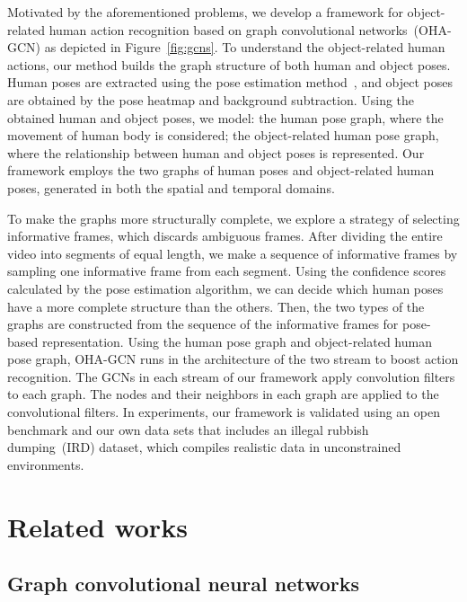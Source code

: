\documentclass[10pt,twocolumn,letterpaper]{article}
\begin{document}
Motivated by the aforementioned problems, we develop a framework 
for object-related human action recognition based on graph convolutional networks~(OHA-GCN) as depicted in Figure~\ref{fig:gcns}.
To understand the object-related human actions, our method builds the graph structure of both human and object poses.
Human poses are extracted using the pose estimation method~\cite{cao2017realtime}, and object poses are obtained by the pose heatmap and background subtraction.
Using the obtained human and object poses, we model:
 the human pose graph, where the movement of human body is considered; 
 the object-related human pose graph, where the relationship between human and object poses is represented.
Our framework employs the two graphs of human poses and object-related human poses, generated in both the spatial and temporal domains.

To make the graphs more structurally complete, we explore a strategy of selecting informative frames, which discards ambiguous frames.  
After dividing the entire video into segments of equal length, we make a sequence of informative frames by sampling one informative frame from each segment.
Using the confidence scores calculated by the pose estimation algorithm, we can decide which human poses have a more complete structure than the others.
Then, the two types of the graphs are constructed from the sequence of the informative frames for pose-based representation.
Using the human pose graph and object-related human pose graph, OHA-GCN runs in the architecture of the two stream to boost action recognition.
The GCNs in each stream of our framework apply convolution filters to each graph.
The nodes and their neighbors in each graph are applied to the convolutional filters. 
In experiments, our framework is validated using an open benchmark and our own data sets that includes an illegal rubbish dumping~(IRD) dataset, which compiles realistic data in unconstrained environments.









\section{Related works}
\subsection{Graph convolutional neural networks}
\end{document}
